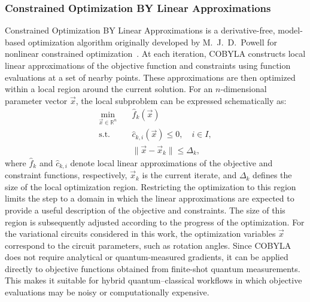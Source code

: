 \subsubsection{Constrained Optimization BY Linear Approximations}
Constrained Optimization BY Linear Approximations is a derivative-free, model-based optimization algorithm originally developed by M.~J.~D.~Powell for nonlinear constrained optimization~\cite{COBYLA}. At each iteration, COBYLA constructs local linear approximations of the objective function and constraints using function evaluations at a set of nearby points. These approximations are then optimized within a local region around the current solution.
For an $n$-dimensional parameter vector $\vec{x}$, the local subproblem can be expressed schematically as:
\begin{equation}
\begin{aligned}
\min_{\vec{x}\in\mathbb{R}^n}
\quad &
\hat{f}_k(\vec{x}) \\
\text{s.t.}\quad &
\hat{c}_{k,i}(\vec{x})\leq 0,
\quad i\in I,\\
&
\|\vec{x}-\vec{x}_k\|\leq\Delta_k,
\end{aligned}
\end{equation}
where $\hat{f}_k$ and $\hat{c}_{k,i}$ denote local linear approximations of the objective and constraint functions, respectively, $\vec{x}_k$ is the current iterate, and $\Delta_k$ defines the size of the local optimization region. Restricting the optimization to this region limits the step to a domain in which the linear approximations are expected to provide a useful description of the objective and constraints. The size of this region is subsequently adjusted according to the progress of the optimization.
For the variational circuits considered in this work, the optimization variables $\vec{x}$ correspond to the circuit parameters, such as rotation angles. Since COBYLA does not require analytical or quantum-measured gradients, it can be applied directly to objective functions obtained from finite-shot quantum measurements. This makes it suitable for hybrid quantum--classical workflows in which objective evaluations may be noisy or computationally expensive.
